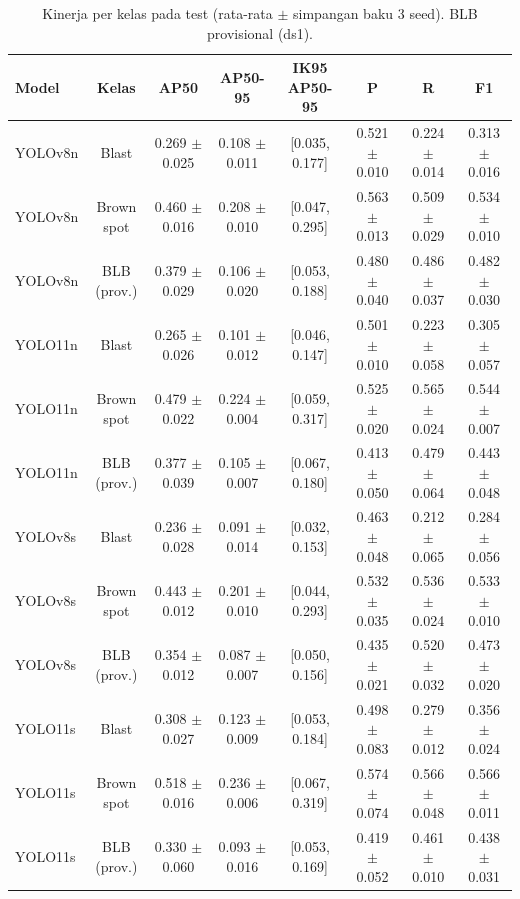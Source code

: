\begin{table}[!t]
\centering
\caption{Kinerja per kelas pada test (rata-rata $\pm$ simpangan baku 3 seed). BLB provisional (ds1).}
\label{tab:per_kelas_test}
\footnotesize
\begin{tabular}{lccccccc}
\hline
\textbf{Model} & \textbf{Kelas} & \textbf{AP50} & \textbf{AP50-95} & \textbf{IK95 AP50-95} & \textbf{P} & \textbf{R} & \textbf{F1} \\
\hline
YOLOv8n & Blast & 0.269 $\pm$ 0.025 & 0.108 $\pm$ 0.011 & [0.035, 0.177] & 0.521 $\pm$ 0.010 & 0.224 $\pm$ 0.014 & 0.313 $\pm$ 0.016 \\
YOLOv8n & Brown spot & 0.460 $\pm$ 0.016 & 0.208 $\pm$ 0.010 & [0.047, 0.295] & 0.563 $\pm$ 0.013 & 0.509 $\pm$ 0.029 & 0.534 $\pm$ 0.010 \\
YOLOv8n & BLB (prov.) & 0.379 $\pm$ 0.029 & 0.106 $\pm$ 0.020 & [0.053, 0.188] & 0.480 $\pm$ 0.040 & 0.486 $\pm$ 0.037 & 0.482 $\pm$ 0.030 \\
YOLO11n & Blast & 0.265 $\pm$ 0.026 & 0.101 $\pm$ 0.012 & [0.046, 0.147] & 0.501 $\pm$ 0.010 & 0.223 $\pm$ 0.058 & 0.305 $\pm$ 0.057 \\
YOLO11n & Brown spot & 0.479 $\pm$ 0.022 & 0.224 $\pm$ 0.004 & [0.059, 0.317] & 0.525 $\pm$ 0.020 & 0.565 $\pm$ 0.024 & 0.544 $\pm$ 0.007 \\
YOLO11n & BLB (prov.) & 0.377 $\pm$ 0.039 & 0.105 $\pm$ 0.007 & [0.067, 0.180] & 0.413 $\pm$ 0.050 & 0.479 $\pm$ 0.064 & 0.443 $\pm$ 0.048 \\
YOLOv8s & Blast & 0.236 $\pm$ 0.028 & 0.091 $\pm$ 0.014 & [0.032, 0.153] & 0.463 $\pm$ 0.048 & 0.212 $\pm$ 0.065 & 0.284 $\pm$ 0.056 \\
YOLOv8s & Brown spot & 0.443 $\pm$ 0.012 & 0.201 $\pm$ 0.010 & [0.044, 0.293] & 0.532 $\pm$ 0.035 & 0.536 $\pm$ 0.024 & 0.533 $\pm$ 0.010 \\
YOLOv8s & BLB (prov.) & 0.354 $\pm$ 0.012 & 0.087 $\pm$ 0.007 & [0.050, 0.156] & 0.435 $\pm$ 0.021 & 0.520 $\pm$ 0.032 & 0.473 $\pm$ 0.020 \\
YOLO11s & Blast & 0.308 $\pm$ 0.027 & 0.123 $\pm$ 0.009 & [0.053, 0.184] & 0.498 $\pm$ 0.083 & 0.279 $\pm$ 0.012 & 0.356 $\pm$ 0.024 \\
YOLO11s & Brown spot & 0.518 $\pm$ 0.016 & 0.236 $\pm$ 0.006 & [0.067, 0.319] & 0.574 $\pm$ 0.074 & 0.566 $\pm$ 0.048 & 0.566 $\pm$ 0.011 \\
YOLO11s & BLB (prov.) & 0.330 $\pm$ 0.060 & 0.093 $\pm$ 0.016 & [0.053, 0.169] & 0.419 $\pm$ 0.052 & 0.461 $\pm$ 0.010 & 0.438 $\pm$ 0.031 \\
\hline
\end{tabular}
\end{table}
